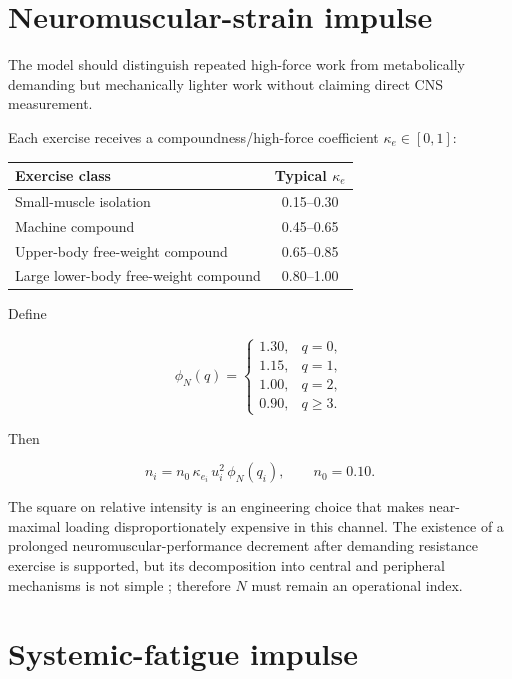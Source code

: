 \documentclass[11pt]{article}
\begin{document}
\section{Neuromuscular-strain impulse}
\label{sec:strain}

The model should distinguish repeated high-force work from metabolically demanding but mechanically lighter work without claiming direct CNS measurement.

Each exercise receives a compoundness/high-force coefficient $\kappa_e\in[0,1]$:

\begin{center}
\begin{tabular}{lc}
\toprule
Exercise class & Typical $\kappa_e$ \\
\midrule
Small-muscle isolation & 0.15--0.30 \\
Machine compound & 0.45--0.65 \\
Upper-body free-weight compound & 0.65--0.85 \\
Large lower-body free-weight compound & 0.80--1.00 \\
\bottomrule
\end{tabular}
\end{center}

Define

\begin{equation}
\phi_N(q)=
\begin{cases}
1.30,&q=0,\\
1.15,&q=1,\\
1.00,&q=2,\\
0.90,&q\ge3.
\end{cases}
\end{equation}

Then

\begin{equation}
n_i=n_0\,\kappa_{e_i}\,u_i^2\,\phi_N(q_i),
\qquad n_0=0.10.
\end{equation}

The square on relative intensity is an engineering choice that makes near-maximal loading disproportionately expensive in this channel. The existence of a prolonged neuromuscular-performance decrement after demanding resistance exercise is supported, but its decomposition into central and peripheral mechanisms is not simple \cite{thomas2018}; therefore $N$ must remain an operational index.

\section{Systemic-fatigue impulse}
\label{sec:systemic}
\end{document}
